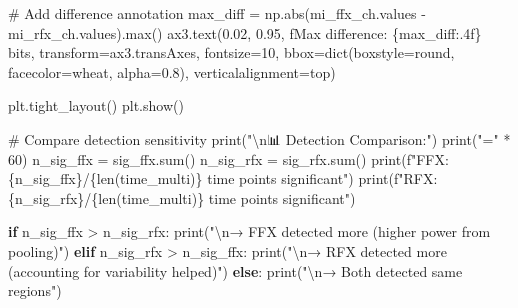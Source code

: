 \documentclass[
  11pt,
  letterpaper,
  oneside,
  openany]{book}
\newenvironment{Shaded}{\begin{snugshade}}{\end{snugshade}}
\newcommand{\BuiltInTok}[1]{\textcolor[rgb]{0.00,0.23,0.31}{#1}}
\newcommand{\CharTok}[1]{\textcolor[rgb]{0.13,0.47,0.30}{#1}}
\newcommand{\CommentTok}[1]{\textcolor[rgb]{0.37,0.37,0.37}{#1}}
\newcommand{\ControlFlowTok}[1]{\textcolor[rgb]{0.00,0.23,0.31}{\textbf{#1}}}
\newcommand{\DecValTok}[1]{\textcolor[rgb]{0.68,0.00,0.00}{#1}}
\newcommand{\FloatTok}[1]{\textcolor[rgb]{0.68,0.00,0.00}{#1}}
\newcommand{\NormalTok}[1]{\textcolor[rgb]{0.00,0.23,0.31}{#1}}
\newcommand{\OperatorTok}[1]{\textcolor[rgb]{0.37,0.37,0.37}{#1}}
\newcommand{\SpecialCharTok}[1]{\textcolor[rgb]{0.37,0.37,0.37}{#1}}
\newcommand{\SpecialStringTok}[1]{\textcolor[rgb]{0.13,0.47,0.30}{#1}}
\newcommand{\StringTok}[1]{\textcolor[rgb]{0.13,0.47,0.30}{#1}}
\begin{document}
\begin{Shaded}
\begin{Highlighting}[]
\CommentTok{\# Add difference annotation}
\NormalTok{max\_diff }\OperatorTok{=}\NormalTok{ np.}\BuiltInTok{abs}\NormalTok{(mi\_ffx\_ch.values }\OperatorTok{{-}}\NormalTok{ mi\_rfx\_ch.values).}\BuiltInTok{max}\NormalTok{()}
\NormalTok{ax3.text(}\FloatTok{0.02}\NormalTok{, }\FloatTok{0.95}\NormalTok{, }\SpecialStringTok{f\textquotesingle{}Max difference: }\SpecialCharTok{\{}\NormalTok{max\_diff}\SpecialCharTok{:.4f\}}\SpecialStringTok{ bits\textquotesingle{}}\NormalTok{, }
\NormalTok{         transform}\OperatorTok{=}\NormalTok{ax3.transAxes, fontsize}\OperatorTok{=}\DecValTok{10}\NormalTok{,}
\NormalTok{         bbox}\OperatorTok{=}\BuiltInTok{dict}\NormalTok{(boxstyle}\OperatorTok{=}\StringTok{\textquotesingle{}round\textquotesingle{}}\NormalTok{, facecolor}\OperatorTok{=}\StringTok{\textquotesingle{}wheat\textquotesingle{}}\NormalTok{, alpha}\OperatorTok{=}\FloatTok{0.8}\NormalTok{),}
\NormalTok{         verticalalignment}\OperatorTok{=}\StringTok{\textquotesingle{}top\textquotesingle{}}\NormalTok{)}

\NormalTok{plt.tight\_layout()}
\NormalTok{plt.show()}

\CommentTok{\# Compare detection sensitivity}
\BuiltInTok{print}\NormalTok{(}\StringTok{"}\CharTok{\textbackslash{}n}\StringTok{📊 Detection Comparison:"}\NormalTok{)}
\BuiltInTok{print}\NormalTok{(}\StringTok{"="} \OperatorTok{*} \DecValTok{60}\NormalTok{)}
\NormalTok{n\_sig\_ffx }\OperatorTok{=}\NormalTok{ sig\_ffx.}\BuiltInTok{sum}\NormalTok{()}
\NormalTok{n\_sig\_rfx }\OperatorTok{=}\NormalTok{ sig\_rfx.}\BuiltInTok{sum}\NormalTok{()}
\BuiltInTok{print}\NormalTok{(}\SpecialStringTok{f"FFX: }\SpecialCharTok{\{}\NormalTok{n\_sig\_ffx}\SpecialCharTok{\}}\SpecialStringTok{/}\SpecialCharTok{\{}\BuiltInTok{len}\NormalTok{(time\_multi)}\SpecialCharTok{\}}\SpecialStringTok{ time points significant"}\NormalTok{)}
\BuiltInTok{print}\NormalTok{(}\SpecialStringTok{f"RFX: }\SpecialCharTok{\{}\NormalTok{n\_sig\_rfx}\SpecialCharTok{\}}\SpecialStringTok{/}\SpecialCharTok{\{}\BuiltInTok{len}\NormalTok{(time\_multi)}\SpecialCharTok{\}}\SpecialStringTok{ time points significant"}\NormalTok{)}

\ControlFlowTok{if}\NormalTok{ n\_sig\_ffx }\OperatorTok{\textgreater{}}\NormalTok{ n\_sig\_rfx:}
    \BuiltInTok{print}\NormalTok{(}\StringTok{"}\CharTok{\textbackslash{}n}\StringTok{→ FFX detected more (higher power from pooling)"}\NormalTok{)}
\ControlFlowTok{elif}\NormalTok{ n\_sig\_rfx }\OperatorTok{\textgreater{}}\NormalTok{ n\_sig\_ffx:}
    \BuiltInTok{print}\NormalTok{(}\StringTok{"}\CharTok{\textbackslash{}n}\StringTok{→ RFX detected more (accounting for variability helped)"}\NormalTok{)}
\ControlFlowTok{else}\NormalTok{:}
    \BuiltInTok{print}\NormalTok{(}\StringTok{"}\CharTok{\textbackslash{}n}\StringTok{→ Both detected same regions"}\NormalTok{)}


\end{Highlighting}
\end{Shaded}
\end{document}

